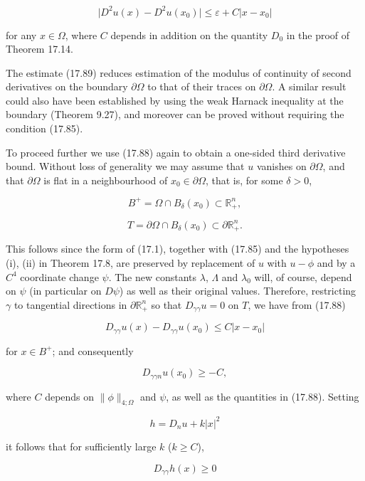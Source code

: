 \begin{equation}
\tag{17.89}
\bigl|D^2 u(x) - D^2 u(x_0)\bigr| \leq \varepsilon + C |x - x_0|
\end{equation}

for any $x \in \Omega$, where $C$ depends in addition on the quantity $D_0$ in the proof of Theorem 17.14.

The estimate (17.89) reduces estimation of the modulus of continuity of second derivatives on the boundary $\partial \Omega$ to that of their traces on $\partial \Omega$. A similar result could also have been established by using the weak Harnack inequality at the boundary (Theorem 9.27), and moreover can be proved without requiring the condition (17.85).

To proceed further we use (17.88) again to obtain a one-sided third derivative bound. Without loss of generality we may assume that $u$ vanishes on $\partial \Omega$, and that $\partial \Omega$ is flat in a neighbourhood of $x_0 \in \partial \Omega$, that is, for some $\delta > 0$,

\[
B^+ = \Omega \cap B_\delta(x_0) \subset \mathbb{R}^n_+,
\]

\[
T = \partial \Omega \cap B_\delta(x_0) \subset \partial \mathbb{R}^n_+.
\]

This follows since the form of (17.1), together with (17.85) and the hypotheses (i), (ii) in Theorem 17.8, are preserved by replacement of $u$ with $u - \phi$ and by a $C^4$ coordinate change $\psi$. The new constants $\lambda$, $\Lambda$ and $\lambda_0$ will, of course, depend on $\psi$ (in particular on $D\psi$) as well as their original values. Therefore, restricting $\gamma$ to tangential directions in $\partial \mathbb{R}^n_+$ so that $D_{\gamma \gamma} u = 0$ on $T$, we have from (17.88)

\[
D_{\gamma \gamma} u(x) - D_{\gamma \gamma} u(x_0) \leq C |x - x_0|
\]

for $x \in B^+$; and consequently

\begin{equation}
\tag{17.90}
D_{\gamma \gamma n} u(x_0) \geq -C,
\end{equation}

where $C$ depends on $\|\phi\|_{4;\Omega}$ and $\psi$, as well as the quantities in (17.88). Setting

\[
h = D_n u + k |x|^2
\]

it follows that for sufficiently large $k$ ($k \geq C$),

\[
D_{\gamma \gamma} h(x) \geq 0
\]


